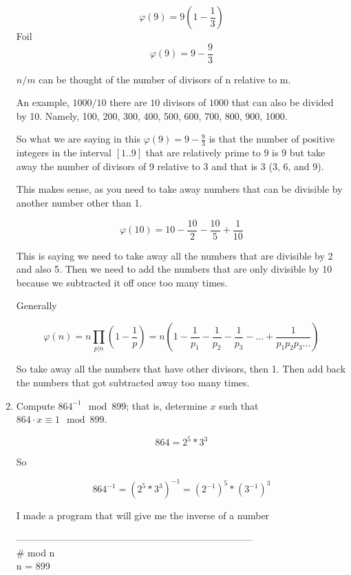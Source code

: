 \documentclass[10pt, AMS Euler]{article}
\begin{document}
\begin{enumerate}
        $$ \varphi(9) = 9 (1-\frac{1}{3}) $$
        Foil
        $$ \varphi(9) = 9-\frac{9}{3} $$


        $n/m$ can be thought of the number of divisors of n relative to m.

        An example, $1000/10$ there are $10$ divisors of $1000$ that can also be divided by 10. Namely, 100, 200, 300, 400, 500, 600, 700, 800, 900, 1000.

        So what we are saying in this $ \varphi(9) = 9-\frac{9}{3} $ is that the number of positive integers in the interval $[1..9]$ that are relatively prime to $9$ is $9$ but take away the number of divisors of 9 relative to 3 and that is 3 (3, 6, and 9). 

        This makes sense, as you need to take away numbers that can be divisible by another number other than 1.
        

        $$ \varphi(10) = 10 - \frac{10}{2} - \frac{10}{5} + \frac{1}{10} $$

         This is saying we need to take away all the numbers that are divisible by 2 and also 5. Then we need to add the numbers that are only divisible by 10 because we subtracted it off once too many times. 


        Generally
        
        $$ \varphi(n) = n \prod_{p | n}\left(1-\frac{1}{p}\right) = n (1-\frac{1}{p_1}-\frac{1}{p_2}-\frac{1}{p_3}-...+\frac{1}{p_1 p_2 p_3 ...}) $$

        So take away all the numbers that have other divisors, then 1. Then add back the numbers that got subtracted away too many times. 


        \newpage	
		\item Compute  $864^{-1} \!\! \mod 899$; that is, determine $x$ such that $864 \cdot x \equiv 1 \!\!\mod 899$.

        $$ 864 = 2^5 * 3^3 $$
        
        So 
        
        $$ 864^{-1} = (2^5 * 3^3)^{-1} = (2^{-1})^5 * (3^{-1})^3 $$
        
        I made a program that will give me the inverse of a number
        
-------------------------------------------------------------------------- \\
            \# mod n \\
            n = 899 \\
            

\end{enumerate}
\end{document}
